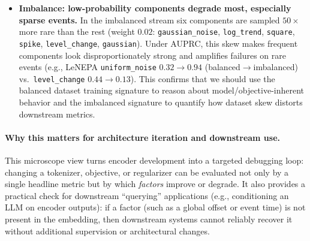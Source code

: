 \begin{itemize}
  \item \textbf{Imbalance: low-probability components degrade most, especially sparse events.} In the imbalanced stream six components are sampled $50\times$ more rare than the rest (weight $0.02$: \texttt{gaussian\_noise}, \texttt{log\_trend}, \texttt{square}, \texttt{spike}, \texttt{level\_change}, \texttt{gaussian}). Under AUPRC, this skew makes frequent components look disproportionately strong and amplifies failures on rare events (e.g., LeNEPA \texttt{uniform\_noise} $0.32\rightarrow0.94$ (balanced$\rightarrow$imbalanced) vs.\ \texttt{level\_change} $0.44\rightarrow0.13$). This confirms that we should use the balanced dataset training signature to reason about model/objective-inherent behavior and the imbalanced signature to quantify how dataset skew distorts downstream metrics.
\end{itemize}

\paragraph{Why this matters for architecture iteration and downstream use.}
This microscope view turns encoder development into a targeted debugging loop: changing a tokenizer, objective, or regularizer can be evaluated not only by a single headline metric but by which \emph{factors} improve or degrade.
It also provides a practical check for downstream ``querying'' applications (e.g., conditioning an LLM on encoder outputs): if a factor (such as a global offset or event time) is not present in the embedding, then downstream systems cannot reliably recover it without additional supervision or architectural changes.

